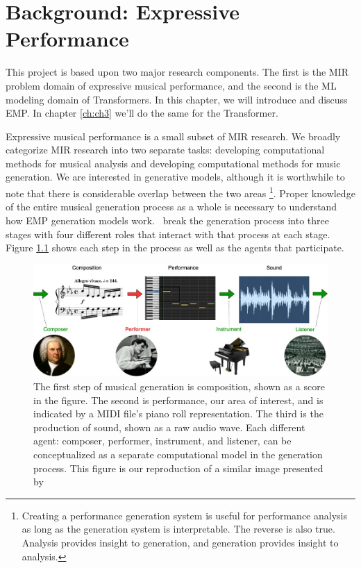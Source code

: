 
\chapter{Background: Expressive Performance}\label{ch:ch2}
This project is based upon two major research components. The first is the MIR problem domain of expressive musical performance, and the second is the ML modeling domain of Transformers. In this chapter, we will introduce and discuss EMP. In chapter \ref{ch:ch3} we'll do the same for the Transformer. 

Expressive musical performance is a small subset of MIR research. We broadly categorize MIR research into two separate tasks: developing computational methods for musical analysis and developing computational methods for music generation. We are interested in generative models, although it is worthwhile to note that there is considerable overlap between the two areas%
\footnote{Creating a performance generation system is useful for performance analysis as long as the generation system is interpretable. The reverse is also true. Analysis provides insight to generation, and generation provides insight to analysis.}. Proper knowledge of the entire musical generation process as a whole is necessary to understand how EMP generation models work.~\citet{ji2020comprehensive} break the generation process into three stages with four different roles that interact with that process at each stage. Figure \ref{fig:generation_process} shows each step in the process as well as the agents that participate.

\begin{figure}
    \centering
    \includegraphics[width=1\linewidth]{figs/ch2/musical_generation.jpg}
    \caption{The first step of musical generation is composition, shown as a score in the figure. The second is performance, our area of interest, and is indicated by a MIDI file's piano roll representation. The third is the production of sound, shown as a raw audio wave. Each different agent: composer, performer, instrument, and listener, can be conceptualized as a separate computational model in the generation process. This figure is our reproduction of a similar image presented by~\citet{ji2020comprehensive}}
    \label{fig:generation_process}
\end{figure}

